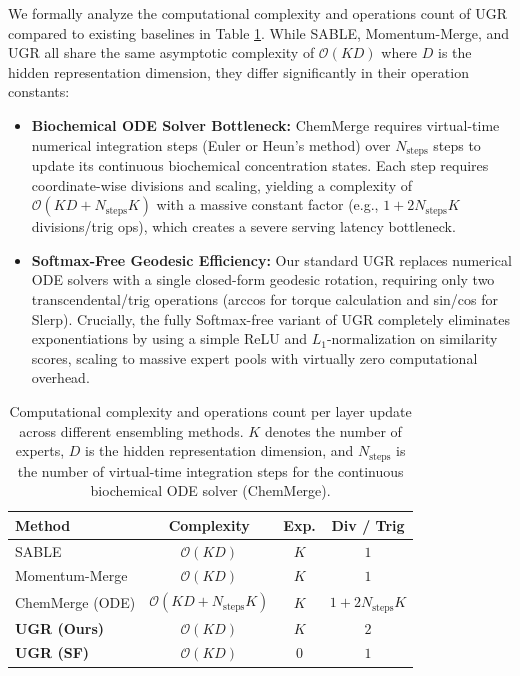 We formally analyze the computational complexity and operations count of UGR compared to existing baselines in Table \ref{tab:complexity}. While SABLE, Momentum-Merge, and UGR all share the same asymptotic complexity of $\mathcal{O}(KD)$ where $D$ is the hidden representation dimension, they differ significantly in their operation constants:
\begin{itemize}
    \item \textbf{Biochemical ODE Solver Bottleneck:} ChemMerge requires virtual-time numerical integration steps (Euler or Heun's method) over $N_{\text{steps}}$ steps to update its continuous biochemical concentration states. Each step requires coordinate-wise divisions and scaling, yielding a complexity of $\mathcal{O}(KD + N_{\text{steps}} K)$ with a massive constant factor (e.g., $1 + 2 N_{\text{steps}} K$ divisions/trig ops), which creates a severe serving latency bottleneck.
    \item \textbf{Softmax-Free Geodesic Efficiency:} Our standard UGR replaces numerical ODE solvers with a single closed-form geodesic rotation, requiring only two transcendental/trig operations (arccos for torque calculation and sin/cos for Slerp). Crucially, the fully Softmax-free variant of UGR completely eliminates exponentiations by using a simple ReLU and $L_1$-normalization on similarity scores, scaling to massive expert pools with virtually zero computational overhead.
\end{itemize}

\begin{table}[h]
\centering
\caption{Computational complexity and operations count per layer update across different ensembling methods. $K$ denotes the number of experts, $D$ is the hidden representation dimension, and $N_{\text{steps}}$ is the number of virtual-time integration steps for the continuous biochemical ODE solver (ChemMerge).}
\label{tab:complexity}
\vskip 0.1in
\begin{footnotesize}
\begin{sc}
\setlength{\tabcolsep}{1.1pt}
\begin{tabular}{lccc}
\toprule
Method & Complexity & Exp. & Div / Trig \\
\midrule
SABLE & $\mathcal{O}(KD)$ & $K$ & $1$ \\
Momentum-Merge & $\mathcal{O}(KD)$ & $K$ & $1$ \\
ChemMerge (ODE) & $\mathcal{O}(KD + N_{\text{steps}} K)$ & $K$ & $1 + 2 N_{\text{steps}} K$ \\
\midrule
\textbf{UGR (Ours)} & $\mathcal{O}(KD)$ & $K$ & $2$ \\
\textbf{UGR (SF)} & $\mathcal{O}(KD)$ & $0$ & $1$ \\
\bottomrule
\end{tabular}
\end{sc}
\end{footnotesize}
\end{table}

